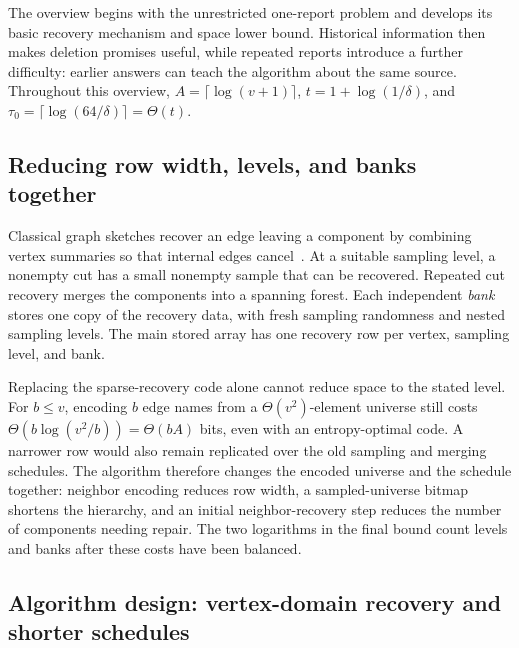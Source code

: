 \documentclass[11pt,letterpaper]{article}
\numberwithin{equation}{section}
\begin{document}
The overview begins with the unrestricted one-report problem and develops its basic recovery mechanism and space lower bound.
Historical information then makes deletion promises useful, while repeated reports introduce a further difficulty: earlier answers can teach the algorithm about the same source.
Throughout this overview, $A=\lceil\log(v+1)\rceil$, $t=1+\log(1/\delta)$, and $\tau_0=\lceil\log(64/\delta)\rceil=\Theta(t)$.

\subsection{Reducing row width, levels, and banks together}
\label{sec:graph-upper-main}

Classical graph sketches recover an edge leaving a component by combining vertex summaries so that internal edges cancel~\cite{AGM2012}.
At a suitable sampling level, a nonempty cut has a small nonempty sample that can be recovered.
Repeated cut recovery merges the components into a spanning forest.
Each independent \emph{bank} stores one copy of the recovery data, with fresh sampling randomness and nested sampling levels.
The main stored array has one recovery row per vertex, sampling level, and bank.

Replacing the sparse-recovery code alone cannot reduce space to the stated level.
For $b\le v$, encoding $b$ edge names from a $\Theta(v^2)$-element universe still costs $\Theta(b\log(v^2/b))=\Theta(bA)$ bits, even with an entropy-optimal code.
A narrower row would also remain replicated over the old sampling and merging schedules.
The algorithm therefore changes the encoded universe and the schedule together: neighbor encoding reduces row width, a sampled-universe bitmap shortens the hierarchy, and an initial neighbor-recovery step reduces the number of components needing repair.
The two logarithms in the final bound count levels and banks after these costs have been balanced.

\subsection{Algorithm design: vertex-domain recovery and shorter schedules}
\end{document}
